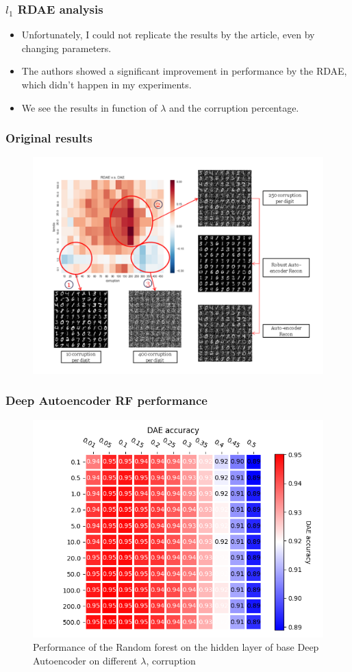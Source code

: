 \documentclass{beamer}
\theoremstyle{plain}
\theoremstyle{definition}
\theoremstyle{remark}
\begin{document}
\begin{frame}
	\frametitle{$l_1$ RDAE analysis}
	\begin{itemize}
		\item Unfortunately, I could not replicate the results by the article, even by changing parameters.
		\item The authors showed a significant improvement in performance by the RDAE, which didn't happen in my experiments.
		\item We see the results in function of $\lambda$ and the corruption percentage.
	\end{itemize}
\end{frame}

\begin{frame}
	\frametitle{Original results}
	\begin{figure}
		\centering
		\includegraphics[width=0.8\linewidth]{Images/original_l1.png}
	\end{figure}
\end{frame}

\begin{frame}
	\frametitle{Deep Autoencoder RF performance}
	\begin{figure}
		\centering
		\includegraphics[width=0.65\linewidth]{Images/DAE_acc.png}
		\caption[]{Performance of the Random forest on the hidden layer of base Deep Autoencoder on different $\lambda$, corruption}
	\end{figure}
\end{frame}
\end{document}
